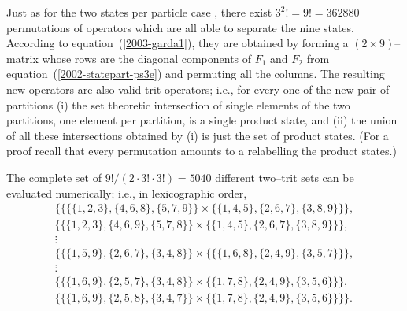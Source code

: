 \documentclass{article}
\begin{document}
Just as for the two states per particle case \cite{DonSvo01},
there exist $3^2!=9!=362880$ permutations of operators
which are all able to separate the nine states.
According to equation~(\ref{2003-garda1}),
they are obtained by forming a $(2\times 9)$--matrix
whose rows are the diagonal components of $F_1$ and $F_2$
from equation~(\ref{2002-statepart-ps3e})
and permuting all the columns.
The resulting new operators are also valid trit operators; i.e.,
for every one of the new pair of partitions
(i) the set theoretic intersection of single elements of the two partitions,
one element per partition, is a single product state,
and
(ii) the union of all these
intersections obtained by (i) is just the set of product states.
(For a proof recall that every permutation amounts to a relabelling the product states.)


The complete set of $9!/(2\cdot 3!\cdot 3!)= 5040$
different two--trit sets can be evaluated numerically; i.e.,
in lexicographic order,
%
%
%
\begin{eqnarray}
&\{\{\{\{1, 2, 3\}, \{4, 6, 8\}, \{5, 7, 9\}\}\times \{\{1, 4, 5\}, \{2, 6, 7\}, \{3, 8, 9\}\}\},  &\label{2002-garda1-lb}    \\
&\{\{\{1, 2, 3\}, \{4, 6, 9\}, \{5, 7, 8\}\}\times \{\{1, 4, 5\}, \{2, 6, 7\}, \{3, 8, 9\}\}\},  &\\
&\vdots         \nonumber                                                             &             \\
&\{\{\{1,5,9\},\{2,6,7\},\{3,4,8\}\}\times \{\{\{1,6,8\},\{2,4,9\},\{3,5,7\}\}\} ,                  & \label{2003-garda-2}    \\
&\vdots         \nonumber                                                             &              \\
&\{\{\{1, 6,   9\}, \{2, 5, 7\}, \{3, 4, 8\}\}\times \{ \{1, 7, 8\}, \{2, 4, 9\}, \{3, 5, 6\}\}\},  &    \\
&\{\{\{1, 6,   9\}, \{2, 5, 8\}, \{3, 4, 7\}\}\times \{ \{1, 7, 8\}, \{2, 4, 9\}, \{3, 5, 6\}\}\}\}.& \label{2002-garda1-lf}
\end{eqnarray}
\end{document}
